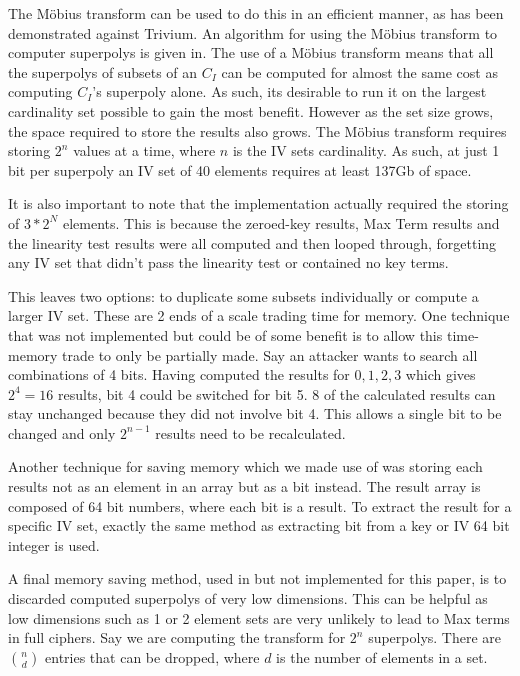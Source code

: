 \documentclass{report}
\begin{document}
The M\"{o}bius transform can be used to do this in an efficient manner, as has been demonstrated against Trivium\cite{MobiusTransform}. An algorithm for using the M\"{o}bius transform to computer superpolys is given in\cite{MobiusTransform}.
The use of a M\"{o}bius transform means that all the superpolys of subsets of an $C_I$ can be computed for almost the same cost as computing $C_I$'s superpoly alone. As such, its desirable to run it on the largest cardinality set possible to gain the most benefit. However as the set size grows, the space required to store the results also grows. The M\"{o}bius transform requires storing $2^n$ values at a time, where $n$ is the IV sets cardinality. As such, at just 1 bit per superpoly an IV set of 40 elements requires at least 137Gb of space.

It is also important to note that the implementation actually required the storing of $3*2^N$ elements. This is because the zeroed-key results, Max Term results and the linearity test results were all computed and then looped through, forgetting any IV set that didn't pass the linearity test or contained no key terms.

This leaves two options: to duplicate some subsets individually or compute a larger IV set. These are 2 ends of a scale trading time for memory. One technique that was not implemented but could be of some benefit is to allow this time-memory trade to only be partially made. Say an attacker wants to search all combinations of 4 bits. Having computed the results for ${0,1,2,3}$ which gives $2^4=16$ results, bit 4 could be switched for bit 5. 8 of the calculated results can stay unchanged because they did not involve bit 4. This allows a single bit to be changed and only $2^{n-1}$ results need to be recalculated.

Another technique for saving memory which we made use of was storing each results not as an element in an array but as a bit instead. The result array is composed of 64 bit numbers, where each bit is a result. To extract the result for a specific IV set, exactly the same method as extracting bit from a key or IV 64 bit integer is used.

A final memory saving method, used in \cite{MobiusTransform} but not implemented for this paper, is to discarded computed superpolys of very low dimensions. This can be helpful as low dimensions such as 1 or 2 element sets are very unlikely to lead to Max terms in full ciphers. Say we are computing the transform for $2^n$ superpolys. There are ${n \choose d}$ entries that can be dropped, where $d$ is the number of elements in a set.
\end{document}
